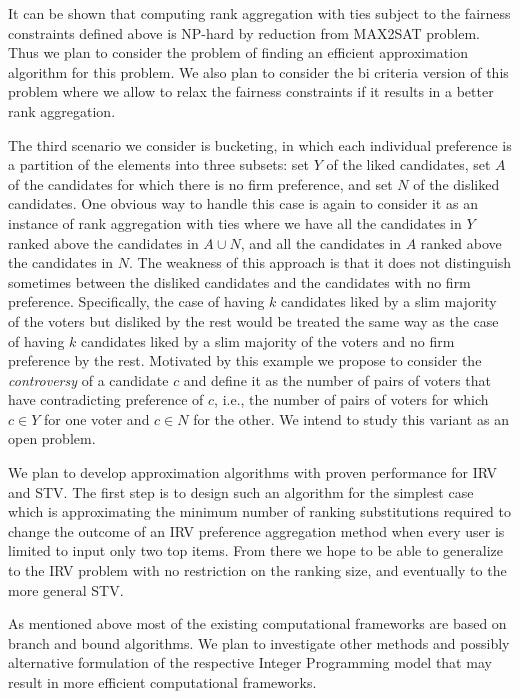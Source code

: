 \documentclass[11pt]{article}
\begin{document}
It can be shown that computing rank aggregation with ties subject to the fairness constraints defined above is NP-hard by reduction from MAX2SAT problem. Thus we plan to consider the problem of finding an efficient approximation algorithm for this problem. We also plan to consider the bi criteria version of this problem where we allow to relax the fairness constraints if it results in a better rank aggregation.

\smallskip {}
The third scenario we consider is bucketing, in which each individual preference is a partition of the elements into three subsets: set $Y$ of the liked candidates,
set $A$ of the candidates for which there is no firm preference, and set $N$ of the disliked candidates. One obvious way to handle this case is again to consider it as an instance of rank aggregation with ties where we have all the candidates in $Y$ ranked above the candidates in $A\cup N$, and all the candidates in $A$ ranked above the candidates in $N$. The weakness of this approach is that it does not distinguish sometimes between the disliked candidates and the candidates with no firm preference. Specifically, the case of having $k$ candidates liked by a slim majority of the voters but disliked by the rest would be treated the same way as the case of having $k$ candidates liked by a slim majority of the voters and no firm preference by the rest.
Motivated by this example we propose to consider the {\em controversy} of a candidate $c$ and define it as the number of pairs of voters that have contradicting preference of $c$, i.e., the number of pairs of voters for which $c \in Y$ for one voter and $c\in N$ for the other. We intend to study this variant as an open problem.
\fi 

\smallskip {} 
We plan to develop approximation algorithms with proven performance for IRV and STV. The first step is to design such an algorithm for the simplest case which is approximating the minimum number of ranking substitutions required to change the outcome of an IRV preference aggregation method when every user is limited to input only two top items. From there we hope to be able to generalize to the IRV problem with no restriction on the ranking size, and eventually to the more general STV.

\smallskip {} 
As mentioned above most of the existing computational frameworks are based on branch and bound algorithms. We plan to investigate other methods and possibly alternative formulation of the respective Integer Programming model that may result in more efficient computational frameworks.
\end{document}
